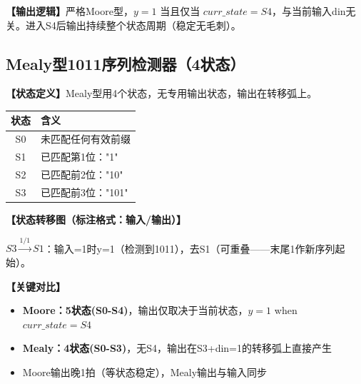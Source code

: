 \textbf{【输出逻辑】}严格Moore型，$y=1$ 当且仅当 $curr\_state=S4$，与当前输入din无关。进入S4后输出持续整个状态周期（稳定无毛刺）。

\subsection{Mealy型1011序列检测器（4状态）}

\textbf{【状态定义】}Mealy型用4个状态，无专用输出状态，输出在转移弧上。

\begin{center}
\begin{tabular}{|c|l|}\hline
状态 & 含义 \\ \hline
S0 & 未匹配任何有效前缀 \\
S1 & 已匹配第1位："1" \\
S2 & 已匹配前2位："10" \\
S3 & 已匹配前3位："101" \\ \hline
\end{tabular}
\end{center}

\textbf{【状态转移图（标注格式：输入/输出）】}

\begin{center}
\end{center}

$S3 \xrightarrow{1/1} S1$：输入=1时y=1（检测到1011），去S1（可重叠——末尾1作新序列起始）。

\textbf{【关键对比】}
\begin{itemize}
  \item \textbf{Moore：5状态(S0-S4)}，输出仅取决于当前状态，$y=1$ when $curr\_state=S4$
  \item \textbf{Mealy：4状态(S0-S3)}，无S4，输出在S3+din=1的转移弧上直接产生
  \item Moore输出晚1拍（等状态稳定），Mealy输出与输入同步
\end{itemize}

